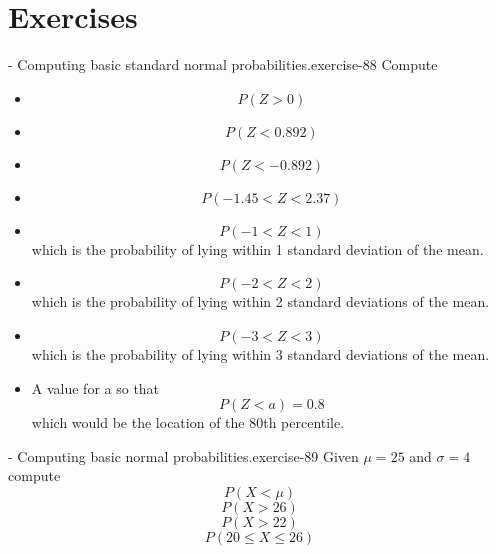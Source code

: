 \documentclass[10pt,]{book}
\numberwithin{equation}{section}
\newcommand{\lt}{<}
\newcommand{\gt}{>}
\begin{document}
\section[{Exercises}]{Exercises}\label{section-64}
\begin{inlineexercise}{- Computing basic standard normal probabilities.}{exercise-88}%
\hypertarget{p-1314}{}%
Compute \leavevmode%
\begin{itemize}[label=\textbullet]
\item{}%
\begin{equation*}
P( Z \gt 0)
\end{equation*}
%
\item{}%
\begin{equation*}
P( Z \lt 0.892)
\end{equation*}
%
\item{}%
\begin{equation*}
P( Z \lt -0.892)
\end{equation*}
%
\item{}%
\begin{equation*}
P( -1.45 \lt Z \lt 2.37)
\end{equation*}
%
\item{}%
\begin{equation*}
P( -1 \lt Z \lt 1)
\end{equation*}
which is the probability of lying within 1 standard deviation of the mean.%
\item{}%
\begin{equation*}
P( -2 \lt Z \lt 2)
\end{equation*}
which is the probability of lying within 2 standard deviations of the mean.%
\item{}%
\begin{equation*}
P( -3 \lt Z \lt 3)
\end{equation*}
which is the probability of lying within 3 standard deviations of the mean.%
\item{}A value for a so that%
\begin{equation*}
P( Z \lt a) = 0.8
\end{equation*}
which would be the location of the 80th percentile.%
\end{itemize}
%
\end{inlineexercise}
\begin{inlineexercise}{- Computing basic normal probabilities.}{exercise-89}%
\hypertarget{p-1315}{}%
Given \(\mu = 25\) and \(\sigma = 4\) compute%
\begin{equation*}
P(X \lt \mu)
\end{equation*}
%
\begin{equation*}
P( X \gt 26)
\end{equation*}
%
\begin{equation*}
P( X \gt 22)
\end{equation*}
%
\begin{equation*}
P( 20 \le X \le 26)
\end{equation*}
%
\end{inlineexercise}
\end{document}

